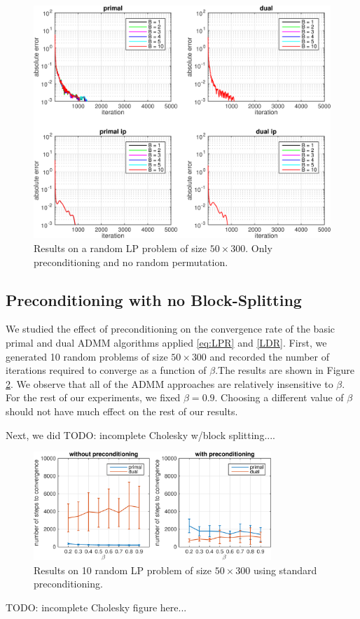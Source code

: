 \documentclass{article}
\begin{document}
\begin{figure}[h]
	\includegraphics[width=\textwidth]{../figures/precond_norndperm.png}
	\caption{Results on a random LP problem of size $50 \times 300$. Only preconditioning and no random permutation.}
	\label{fig:p_nor}
\end{figure}

\subsection*{Preconditioning with no Block-Splitting}

We studied the effect of preconditioning on the convergence rate of the basic primal and dual ADMM algorithms applied \eqref{eq:LPR} and \eqref{LDR}. First, we generated 10 random problems of size $50 \times 300$ and recorded the number of iterations required to converge as a function of $\beta$.The results  are shown in Figure \ref{fig:base_p_d}. We observe that all of the ADMM approaches are relatively insensitive to $\beta$. For the rest of our experiments, we fixed $\beta=0.9$. Choosing a different value of $\beta$ should not have much effect on the rest of our results. 

Next, we did TODO: incomplete Cholesky w/block splitting....

\begin{figure}[ht]
	\centering
	\includegraphics[width=0.8\textwidth]{../figures/primal_dual_preconditioning.png}
	\caption{Results on 10 random LP problem of size $50 \times 300$ using standard preconditioning. }
	\label{fig:base_p_d}
\end{figure}
TODO: incomplete Cholesky figure here...
\end{document}
